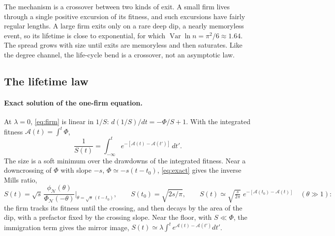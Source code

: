 \documentclass[11pt]{article}
\newcommand{\Var}{\operatorname{Var}}
\newcommand{\PhiN}{\Phi_{\mathcal N}}
\newcommand{\phiN}{\phi_{\mathcal N}}
\begin{document}
The mechanism is a crossover between two kinds of exit.  A small firm lives through a single
positive excursion of its fitness, and such excursions have fairly regular lengths.  A large firm
exits only on a rare deep dip, a nearly memoryless event, so its lifetime is close to
exponential, for which $\Var\ln n=\pi^2/6\approx1.64$.  The spread grows with size until exits
are memoryless and then saturates.  Like the degree channel, the life-cycle bend is a crossover,
not an asymptotic law.

\subsection{The lifetime law}
\label{sec:rice}

\paragraph{Exact solution of the one-firm equation.}  At $\lambda=0$, \eqref{eq:firm} is linear in
$1/S$: $d(1/S)/dt=-\Phi/S+1$.  With the integrated fitness $\mathcal A(t)=\int^t\Phi$,
\begin{equation}
  \frac1{S(t)}=\int_{-\infty}^t e^{-[\mathcal A(t)-\mathcal A(t')]}\,dt' .
  \label{eq:exact}
\end{equation}
The size is a soft minimum over the drawdowns of the integrated fitness.  Near a downcrossing of
$\Phi$ with slope $-s$, $\Phi\simeq-s(t-t_0)$, \eqref{eq:exact} gives the inverse Mills ratio,
\begin{equation}
  S(t)=\sqrt s\,\frac{\phiN(\theta)}{\PhiN(-\theta)}\Big|_{\theta=\sqrt s\,(t-t_0)}\!\!,\qquad
  S(t_0)=\sqrt{2s/\pi},\qquad
  S(t)\simeq\sqrt{\tfrac{s}{2\pi}}\;e^{-[\mathcal A(t_0)-\mathcal A(t)]}\quad(\theta\gg1):
  \label{eq:mills}
\end{equation}
the firm tracks its fitness until the crossing, and then decays by the area of the dip, with a
prefactor fixed by the crossing slope.  Near the floor, with $S\ll\Phi$, the immigration term
gives the mirror image, $S(t)\simeq\lambda\int^te^{\mathcal A(t)-\mathcal A(t')}dt'$.
\end{document}
